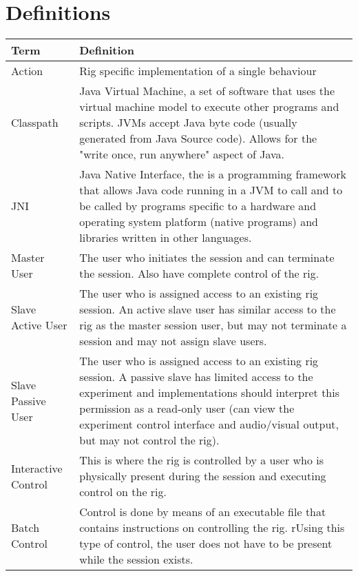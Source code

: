 \section{Definitions}
\begin{tabular}{|l|p{11cm}|}
	\hline
	\bf Term & \bf Definition \\ \hline
	Action & Rig specific implementation of a single behaviour \\ \hline
	Classpath & Java Virtual Machine, a set of software that uses the virtual machine model to execute other programs and scripts.  JVMs accept Java byte code (usually generated from Java Source code).  Allows for the "write once, run anywhere" aspect of Java.\\ \hline
	JNI & Java Native Interface, the is a programming framework that allows Java code running in a JVM  to call and to be called by programs specific to a hardware and operating system platform (native programs) and libraries written in other languages. \\ \hline
	Master User & The user who initiates the session and can terminate the session. Also have complete control of the rig. \\ \hline
	Slave Active User & The user who is assigned access to an existing rig session.  An active slave user has similar access to the rig as the master session user, but may not terminate a session and may not assign slave users.\\ \hline
	Slave Passive User & The user who is assigned access to an existing rig session.  A passive slave has limited access to the experiment and implementations should interpret this permission as a read-only user (can view the experiment control interface and audio/visual output, but may not control the rig). \\ \hline
	Interactive Control & This is where the rig is controlled by a user who is physically present during the session and executing control on the rig. \\ \hline
	Batch Control & Control is done by means of an executable file that contains instructions on controlling the rig.  rUsing this type of control, the user does not have to be present while the session exists. \\ \hline
\end{tabular}


